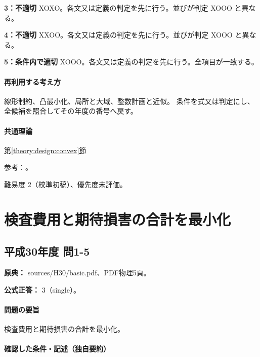 \noindent\textbf{3：不適切} XOXO。各文又は定義の判定を先に行う。並びが判定 XOOO と異なる。\par

\noindent\textbf{4：不適切} XXOO。各文又は定義の判定を先に行う。並びが判定 XOOO と異なる。\par

\noindent\textbf{5：条件内で適切} XOOO。各文又は定義の判定を先に行う。全項目が一致する。\par

\paragraph{再利用する考え方} 線形制約、凸最小化、局所と大域、整数計画と近似。 条件を式又は判定にし、全候補を照合してその年度の番号へ戻す。

\paragraph{共通理論} \hyperref[theory:design:convex]{第\ref*{theory:design:convex}節}

\par 参考：\cite{finish56_convex}。

\par 難易度 2（校準初稿）、優先度未評価。

\section{検査費用と期待損害の合計を最小化}

\subsection{平成30年度 問1-5}
\label{q:h30-reg-basic-1-5}

\noindent\textbf{原典：} sources/H30/basic.pdf、PDF物理5頁。

\textbf{公式正答：} 3（single）。

\paragraph{問題の要旨} 検査費用と期待損害の合計を最小化。

\paragraph{確認した条件・記述（独自要約）}\mbox{}\par

